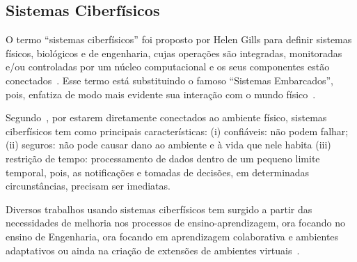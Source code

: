 

\subsection{Sistemas Ciberfísicos}\label{section:ciberfisico}
O termo ``sistemas ciberfísicos'' foi proposto por Helen Gills para definir sistemas físicos, biológicos e de engenharia, cujas operações são integradas, monitoradas e/ou controladas por um núcleo computacional e os seus componentes estão conectados~\citep{wade:2015}. Esse termo está substituindo o famoso ``Sistemas Embarcados'', pois, enfatiza de modo mais evidente sua interação com o mundo físico~\citep{helps:2013}.

Segundo~\cite{chase:2011}, por estarem diretamente conectados ao ambiente físico, sistemas ciberfísicos tem como principais características: (i) confiáveis: não podem falhar; (ii) seguros: não pode causar dano ao ambiente e à vida que nele habita (iii) restrição de tempo: processamento de dados dentro de um pequeno limite temporal, pois, as notificações e tomadas de decisões, em determinadas circunstâncias, precisam ser imediatas.

Diversos trabalhos usando sistemas ciberfísicos tem surgido a partir das necessidades de melhoria nos processos de ensino-aprendizagem, ora focando no ensino de Engenharia, ora focando em aprendizagem colaborativa e ambientes adaptativos ou ainda na criação de extensões de ambientes virtuais~\citep{Santos:2014,lei:2013,wade:2015,noor:2011,pester:2015,peter:2015}.

